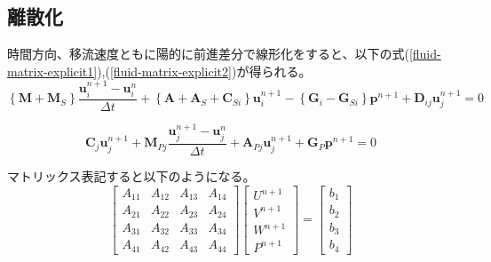 \subsection{離散化}
時間方向、移流速度ともに陽的に前進差分で線形化をすると、以下の式(\ref{fluid-matrix-explicit1}),(\ref{fluid-matrix-explicit2})が得られる。
\begin{equation}
\label{fluid-matrix-explicit1}
		\left\{\bm{M}+\bm{M}_S\right\} \frac{\bm{u}_i^{n+1}-\bm{u}_i^n}{\Delta t}
		+ \left\{\bm{A}+\bm{A}_S + \bm{C}_{Si}\right\} \bm{u}_i^{n+1}
		-\left\{\bm{G}_i-\bm{G}_{S i}\right\} \bm{p}^{n+1}
		+\bm{D}_{i j} \bm{u}_j^{n+1}=0
\end{equation}

\begin{equation}
\label{fluid-matrix-explicit2}
		\bm{C}_j \bm{u}_j^{n+1}+\bm{M}_{P j} \frac{\bm{u}_j^{n+1}-\bm{u}_j^n}{\Delta t}
		+\bm{A}_{P j} \bm{u}_j^{n+1}
		+\bm{G}_P \bm{p}^{n+1}=0
\end{equation}

マトリックス表記すると以下のようになる。
\begin{equation}
	\left[\begin{array}{llll}
		A_{11} & A_{12} & A_{13} & A_{14}\\ 
		A_{21} & A_{22} & A_{23} & A_{24}\\ 
		A_{31} & A_{32} & A_{33} & A_{34}\\
		A_{41} & A_{42} & A_{43} & A_{44}
	\end{array}
	\right]\left
	[
	\begin{array}{l}
		U^{n+1} \\ 
		V^{n+1} \\
		W^{n+1} \\
		P^{n+1}
	\end{array}
	\right]
	=\left[
	\begin{array}{l}
		b_1 \\ 
		b_2 \\ 
		b_3 \\
		b_4
	\end{array}
	\right]
\end{equation}

